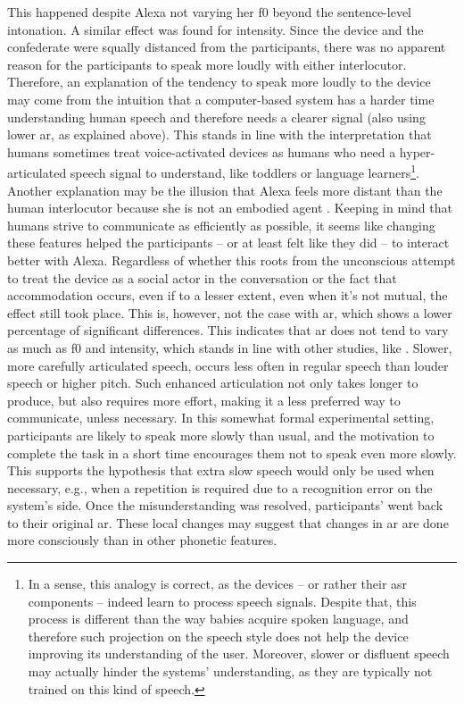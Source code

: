 This happened despite Alexa not varying her \ac{f0} beyond the sentence-level intonation.
A similar effect was found for intensity.
Since the device and the confederate were squally distanced from the participants, there was no apparent reason for the participants to speak more loudly with either interlocutor.
Therefore, an explanation of the tendency to speak more loudly to the device may come from the intuition that a computer-based system has a harder time understanding human speech and therefore needs a clearer signal (also using lower \ac{ar}, as explained above).
This stands in line with the interpretation that humans sometimes treat voice-activated devices as humans who need a hyper-articulated speech signal to understand, like toddlers or language learners\footnote{In a sense, this analogy is correct, as the devices -- or rather their \ac{asr} components -- indeed learn to process speech signals.
Despite that, this process is different than the way babies acquire spoken language, and therefore such projection on the speech style does not help the device improving its understanding of the user.
Moreover, slower or disfluent speech may actually hinder the systems' understanding, as they are typically not trained on this kind of speech.}.
Another explanation may be the illusion that Alexa feels more distant than the human interlocutor because she is not an embodied agent \citep[cf.][and see \cref{sec:types_of_sdss} for further details]{Staum2010virtually, Gijssels2016speech}.
Keeping in mind that humans strive to communicate as efficiently as possible, it seems like changing these features helped the participants -- or at least felt like they did -- to interact better with Alexa.
Regardless of whether this roots from the unconscious attempt to treat the device as a social actor in the conversation \citep{Nass1994computers, Nass2000machines} or the fact that accommodation occurs, even if to a lesser extent, even when it's not mutual, the effect still took place.
This is, however, not the case with \ac{ar}, which shows a lower percentage of significant differences.
This indicates that \ac{ar} does not tend to vary as much as \ac{f0} and intensity, which stands in line with other studies, like \citet{Schweitzer2013convergence}.
Slower, more carefully articulated speech, occurs less often in regular speech than louder speech or higher pitch.
Such enhanced articulation not only takes longer to produce, but also requires more effort, making it a less preferred way to communicate, unless necessary.
In this somewhat formal experimental setting, participants are likely to speak more slowly than usual, and the motivation to complete the task in a short time encourages them not to speak even more slowly.
This supports the hypothesis that extra slow speech would only be used when necessary, e.g., when a repetition is required due to a recognition error on the system's side.
Once the misunderstanding was resolved, participants' went back to their original \ac{ar}.
These local changes may suggest that changes in \ac{ar} are done more consciously than in other phonetic features.

